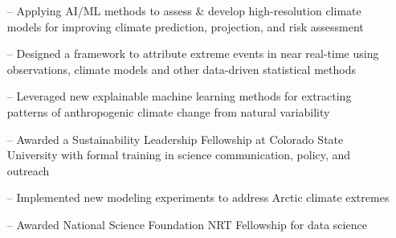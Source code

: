 \documentclass[10pt,a4paper]{altacv}
\begin{document}
\vspace*{-0.37cm}

\begin{itemize}
    \setlength{\itemindent}{0.5em}
    \item[--]   \small{Applying AI\slash ML methods to assess \& develop high-resolution climate models for improving climate prediction, projection, and risk assessment}
\end{itemize}
\medskip


\begin{itemize}
    \setlength{\itemindent}{0.5em}
    \item[--]   \small{Designed a framework to attribute extreme events in near real-time using observations, climate models and other data-driven statistical methods}
\end{itemize}
\medskip

\begin{itemize}
    \setlength{\itemindent}{0.5em}
    \item[--]   \small{Leveraged new explainable machine learning methods for extracting patterns of anthropogenic climate change from natural variability}
    \item[--]    \small{Awarded a Sustainability Leadership Fellowship at Colorado State University with formal training in science communication, policy, and outreach}
\end{itemize}
\medskip

\begin{itemize}
    \setlength{\itemindent}{0.5em}
    \item[--]   \small{Implemented new modeling experiments to address Arctic climate extremes}
    \item[--]    \small{Awarded National Science Foundation NRT Fellowship for data science}
\end{itemize}
\end{document}
